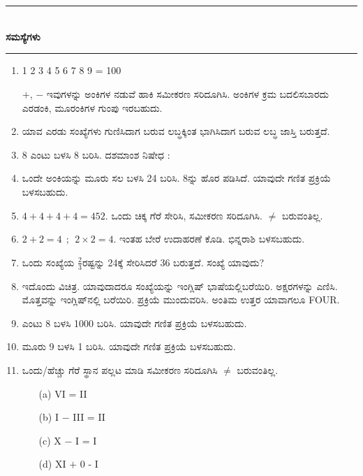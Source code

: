\chapter[ಅಧ್ಯಾಯ 8]{}\label{chap8}

\begin{center}
\rule{5cm}{1pt}\\[5pt]
{\Large\bfseries ಸಮಸ್ಯೆಗಳು}\\[3pt]
\rule{5cm}{1pt}
\end{center}

\begin{enumerate}
\renewcommand{\labelenumi}{\bf\theenumi.}
\itemsep=5pt

\item 1 2 3 4 5 6 7 8 9 = 100

$+$, $-$ ಇವುಗಳನ್ನು ಅಂಕಿಗಳ ನಡುವೆ ಹಾಕಿ ಸಮೀಕರಣ ಸರಿದೂಗಿಸಿ. ಅಂಕಿಗಳ ಕ್ರಮ ಬದಲಿಸಬಾರದು ಎರಡಂಕಿ, ಮೂರಂಕಿಗಳ ಗುಂಪು ಇರಬಹುದು. 

\item ಯಾವ ಎರಡು ಸಂಖ್ಯೆಗಳು ಗುಣಿಸಿದಾಗ ಬರುವ ಲಬ್ಧಕ್ಕಿಂತ ಭಾಗಿಸಿದಾಗ ಬರುವ ಲಬ್ಧ ಜಾಸ್ತಿ ಬರುತ್ತದೆ. 

\item 8 ಎಂಟು ಬಳಸಿ 8 ಬರಿಸಿ. ದಶಮಾಂಶ ನಿಷೇಧ :

\item ಒಂದೇ ಅಂಕಿಯನ್ನು ಮೂರು ಸಲ ಬಳಸಿ 24 ಬರಿಸಿ. 8ನ್ನು ಹೊರ ಪಡಿಸಿದೆ. ಯಾವುದೇ ಗಣಿತ ಪ್ರಕ್ರಿಯೆ ಬಳಸಬಹುದು. 

\item $4 + 4 + 4 + 4 = 452$. ಒಂದು ಚಿಕ್ಕ ಗೆರೆ ಸೇರಿಸಿ, ಸಮೀಕರಣ ಸರಿದೂಗಿಸಿ. $\neq$ ಬರುವಂತಿಲ್ಲ. 

\item $2 + 2 = 4 ~~;~~ 2\times 2 = 4$. ಇಂತಹ ಬೇರೆ ಉದಾಹರಣೆ ಕೊಡಿ. ಭಿನ್ನರಾಶಿ ಬಳಸಬಹುದು. 

\item ಒಂದು ಸಂಖ್ಯೆಯ $\frac{2}{3}$ರಷ್ಟನ್ನು 24ಕ್ಕೆ ಸೇರಿಸಿದರೆ 36 ಬರುತ್ತದೆ. ಸಂಖ್ಯೆ ಯಾವುದು? 

\item ಇದೊಂದು ವಿಚಿತ್ರ. ಯಾವುದಾದರೂ ಸಂಖ್ಯೆಯನ್ನು ಇಂಗ್ಲಿಷ್ ಭಾಷೆಯಲ್ಲಿ\break ಬರೆಯಿರಿ. ಅಕ್ಷರಗಳನ್ನು ಎಣಿಸಿ. ಮೊತ್ತವನ್ನು ಇಂಗ್ಲಿಷ್‌ನಲ್ಲಿ ಬರೆಯಿರಿ. ಪ್ರಕ್ರಿಯೆ ಮುಂದುವರಿಸಿ. ಅಂತಿಮ ಉತ್ತರ ಯಾವಾಗಲೂ FOUR.

\item ಎಂಟು 8 ಬಳಸಿ 1000 ಬರಿಸಿ. ಯಾವುದೇ ಗಣಿತ ಪ್ರಕ್ರಿಯೆ ಬಳಸಬಹುದು. 

\item ಮೂರು 9 ಬಳಸಿ 1  ಬರಿಸಿ. ಯಾವುದೇ ಗಣಿತ ಪ್ರಕ್ರಿಯೆ ಬಳಸಬಹುದು. 

\item ಒಂದು/ಹೆಚ್ಚು ಗೆರೆ ಸ್ಥಾನ ಪಲ್ಲಟ ಮಾಡಿ ಸಮೀಕರಣ ಸರಿದೂಗಿಸಿ $\neq$ ಬರುವಂತಿಲ್ಲ. 
\begin{itemize}
\item[(a)] VI = II
\item[(b)] I $-$ III = II
\item[(c)] X $-$ I = I
\item[(d)] XI $+$ 0 - I
\end{itemize}


\end{enumerate}
